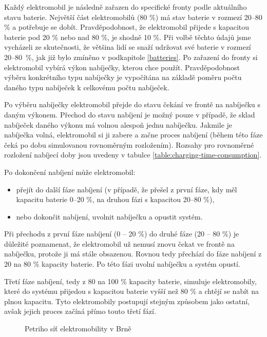 \documentclass[a4paper,11pt]{article}
\begin{document}
Každý elektromobil je následně zařazen do specifické fronty podle aktuálního stavu baterie. Největší část elektromobilů (80 \%) má stav baterie v rozmezí 20–80 \% a potřebuje se dobít. Pravděpodobnost, že elektromobil přijede s kapacitou baterie pod 20 \% nebo nad 80 \%, je shodně 10 \%. Při volbě těchto údajů jsme vycházeli ze skutečnosti, že většina lidí se snaží udržovat své baterie v rozmezí 20–80~\%, jak již bylo zmíněno v podkapitole \ref{batteries}. Po zařazení do fronty si elektromobil vybírá výkon nabíječky, kterou chce použít. Pravděpodobnost výběru konkrétního typu nabíječky je vypočítána na základě poměru počtu daného typu nabíječek k celkovému počtu nabíječek. 

Po výběru nabíječky elektromobil přejde do stavu čekání ve frontě na nabíječku s daným výkonem. Přechod do stavu nabíjení je možný pouze v případě, že sklad nabíječek daného výkonu má volnou alespoň jednu nabíječku. Jakmile je nabíječka volná, elektromobil si ji zabere a začne proces nabíjení (během této fáze čeká po dobu simulovanou rovnoměrným rozložením). Rozsahy pro rovnoměrné rozložení nabíjecí doby jsou uvedeny v tabulce \ref{table:charging-time-consumption}.


Po dokončení nabíjení může elektromobil:
\begin{itemize}
    \item přejít do další fáze nabíjení (v případě, že přešel z první fáze, kdy měl kapacitu baterie 0–20 \%, na druhou fázi s kapacitou 20–80 \%),
    \item nebo dokončit nabíjení, uvolnit nabíječku a opustit systém.
\end{itemize}

Při přechodu z první fáze nabíjení (0 -- 20 \%) do druhé fáze (20 -- 80 \%) je důležité poznamenat, že elektromobil už nemusí znovu čekat ve frontě na nabíječku, protože ji má stále obsazenou. Rovnou tedy přechází do fáze nabíjení z 20 na 80 \% kapacity baterie. Po této fázi uvolní nabíječku a systém opustí.

Třetí fáze nabíjení, tedy z 80 na 100 \% kapacity baterie, simuluje elektromobily, které do systému přijedou s kapacitou baterie vyšší než 80 \% a chtějí se nabít na plnou kapacitu. Tyto elektromobily postupují stejným způsobem jako ostatní, avšak jejich proces začíná přímo touto třetí fází.


\begin{figure}[H]
    \centering
    \caption{Petriho síť elektromobility v Brně}
    \label{figure:ims-petri-net}
\end{figure}
\end{document}
